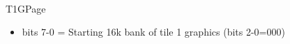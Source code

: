 \\
T1GPage
\begin{itemize}
\item bits 7-0 = Starting 16k bank of tile 1 graphics (bits 2-0=000)
\end{itemize}

